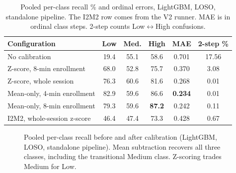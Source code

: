 \documentclass[journal]{IEEEtran}
\begin{document}
\begin{table}[!t]
\caption{Pooled per-class recall \% and ordinal errors, LightGBM, LOSO,
standalone pipeline. The I2M2 row comes from the V2 runner. MAE is in ordinal
class steps. 2-step counts Low$\leftrightarrow$High confusions.}
\label{tab:classes}
\centering\footnotesize
\setlength{\tabcolsep}{4pt}
\begin{tabular}{@{}lccccc@{}}
\toprule
Configuration & Low & Med. & High & MAE & 2-step \% \\
\midrule
No calibration              & 19.4 & 55.1 & 58.6 & 0.701 & 17.56 \\
Z-score, 8-min enrollment   & 68.0 & 52.8 & 75.7 & 0.370 & 3.08 \\
Z-score, whole session      & 76.3 & 60.6 & 81.6 & 0.268 & 0.01 \\
Mean-only, 4-min enrollment & 82.9 & 59.6 & 86.6 & \textbf{0.234} & 0.01 \\
Mean-only, 8-min enrollment & 79.3 & 59.6 & \textbf{87.2} & 0.242 & 0.11 \\
I2M2, whole-session z-score & 46.4 & 47.4 & 73.3 & 0.428 & 0.67 \\
\bottomrule
\end{tabular}
\end{table}

\begin{figure}[!t]
\centering
{}
\caption{Pooled per-class recall before and after calibration (LightGBM,
LOSO, standalone pipeline). Mean subtraction recovers all three classes,
including the transitional Medium class. Z-scoring trades Medium for Low.}
\label{fig:classes}
\end{figure}
\end{document}
